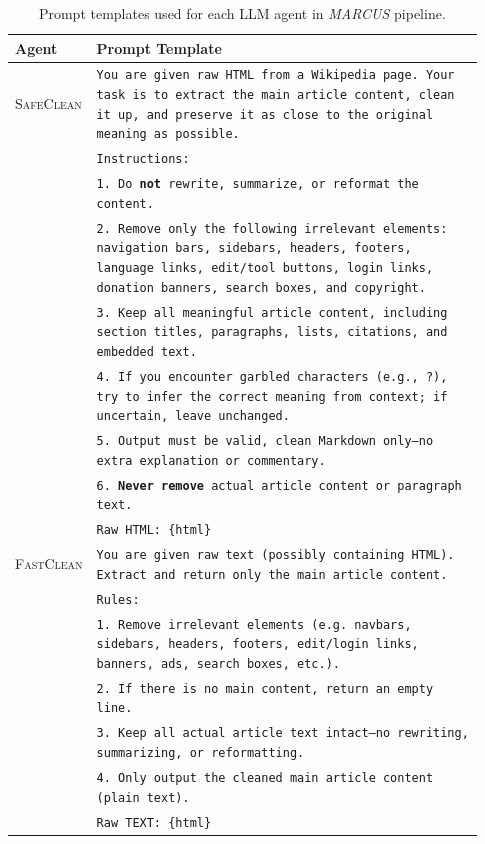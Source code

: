 \documentclass[11pt]{article}
\newcommand{\mymethod}{\emph{MARCUS}}
\begin{document}
\begin{table}[h]
\centering
\small
\caption{Prompt templates used for each LLM agent in \mymethod{} pipeline.}
\label{tab:agent-prompts}
\begin{tabular}{p{0.1\linewidth} | p{0.83\linewidth}}
\toprule
\textbf{Agent} & \textbf{Prompt Template} \\
\midrule

\textsc{SafeClean} &
\texttt{You are given raw HTML from a Wikipedia page. Your task is to extract the main article content, clean it up, and preserve it as close to the original meaning as possible.} \\
& \texttt{Instructions:} \\
& \texttt{1. Do \textbf{not} rewrite, summarize, or reformat the content.} \\
& \texttt{2. Remove only the following irrelevant elements: navigation bars, sidebars, headers, footers, language links, edit/tool buttons, login links, donation banners, search boxes, and copyright.} \\
& \texttt{3. Keep all meaningful article content, including section titles, paragraphs, lists, citations, and embedded text.} \\
& \texttt{4. If you encounter garbled characters (e.g., ?), try to infer the correct meaning from context; if uncertain, leave unchanged.} \\
& \texttt{5. Output must be valid, clean Markdown only—no extra explanation or commentary.} \\
& \texttt{6. \textbf{Never remove} actual article content or paragraph text.} \\
& \texttt{Raw HTML: \{html\}} \\
\midrule

\textsc{FastClean} &
\texttt{You are given raw text (possibly containing HTML). Extract and return only the main article content.} \\
& \texttt{Rules:} \\
& \texttt{1. Remove irrelevant elements (e.g. navbars, sidebars, headers, footers, edit/login links, banners, ads, search boxes, etc.).} \\
& \texttt{2. If there is no main content, return an empty line.} \\
& \texttt{3. Keep all actual article text intact—no rewriting, summarizing, or reformatting.} \\
& \texttt{4. Only output the cleaned main article content (plain text).} \\
& \texttt{Raw TEXT: \{html\}} \\
\midrule


\end{tabular}
\end{table}
\end{document}
